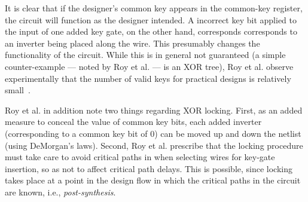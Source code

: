 It is clear that if the designer's common key appears in the common-key register, the circuit will function as the designer intended. A incorrect key bit applied to the input of one added key gate, on the other hand, corresponds corresponds to an inverter being placed along the wire. This presumably changes the functionality of the circuit. While this is in general not guaranteed (a simple counter-example --- noted by Roy et al. ---  is an XOR tree), Roy et al. observe experimentally that the number of valid keys for practical designs is relatively small~\cite{roy2008epic}.

Roy et al. in addition note two things regarding XOR locking. First, as an added measure to conceal the value of common key bits, each added inverter (corresponding to a common key bit of 0) can be moved up and down the netlist (using DeMorgan's laws). Second, Roy et al. prescribe that the locking procedure must take care to avoid critical paths in when selecting wires for key-gate insertion, so as not to affect critical path delays. This is possible, since locking takes place at a point in the design flow in which the critical paths in the circuit are known, i.e., \emph{post-synthesis}.



